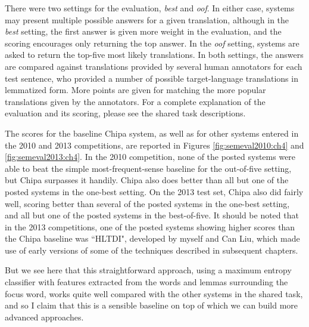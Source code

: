 There were two settings for the evaluation, \emph{best} and \emph{oof}. In
either case, systems may present multiple possible answers for a given
translation, although in the \emph{best} setting, the first answer is given
more weight in the evaluation, and the scoring encourages only returning the
top answer.
In the \emph{oof} setting, systems are asked to return the top-five most likely
translations. In both settings, the answers are compared against translations
provided by several human annotators for each test sentence, who provided a
number of possible target-language translations in lemmatized form.  More
points are given for matching the more popular translations given by the
annotators. For a complete explanation of the evaluation and its scoring,
please see the shared task descriptions.

The scores for the baseline Chipa system, as well as for other systems
entered in the 2010 and 2013 competitions, are reported in Figures
\ref{fig:semeval2010:ch4} and \ref{fig:semeval2013:ch4}.
In the 2010 competition, none of the posted systems were able to beat the
simple most-frequent-sense baseline for the out-of-five setting, but Chipa
surpasses it handily. Chipa also does better than all but one of the posted
systems in the one-best setting. On the 2013 test set, Chipa also did fairly
well, scoring better than several of the posted systems in the one-best
setting, and all but one of the posted systems in the best-of-five. 
It should be noted that in the 2013 competitions, one of the posted systems
showing higher scores than the Chipa baseline was ``HLTDI", developed by myself
and Can Liu\cite{rudnick-liu-gasser:2013:SemEval-2013}, which made use of early
versions of some of the techniques described in subsequent chapters.

But we see here that this straightforward approach, using a maximum entropy
classifier with features extracted from the words and lemmas surrounding the
focus word, works quite well compared with the other systems in the shared
task, and so I claim that this is a sensible baseline on top of which we can
build more advanced approaches.
